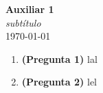 \documentclass{article}
\begin{document}


\begin{center}
    \Huge{\textbf{Auxiliar 1}}\\
\textit{\large{subtítulo}}\\
    \normalsize
    \today
\end{center}

\begin{enumerate}
	\item \textbf{(Pregunta 1)} lal
	\item \textbf{(Pregunta 2)} lel
\end{enumerate}
\end{document}
